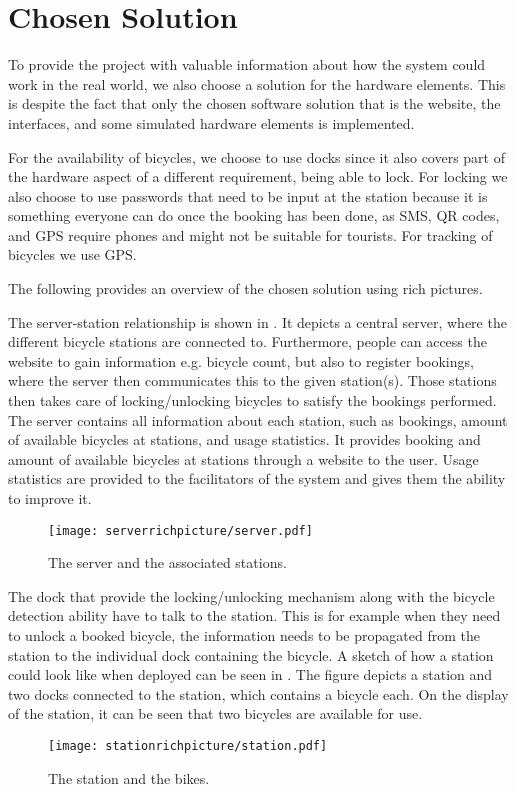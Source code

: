 \section{Chosen Solution}
To provide the project with valuable information about how the system could work in the real world, we also choose a solution for the hardware elements.
This is despite the fact that only the chosen software solution that is the website, the interfaces, and some simulated hardware elements is implemented.

For the availability of bicycles, we choose to use docks since it also covers part of the hardware aspect of a different requirement, being able to lock.  
For locking we also choose to use passwords that need to be input at the station because it is something everyone can do once the booking has been done, as SMS, QR codes, and GPS require phones and might not be suitable for tourists.
For tracking of bicycles we use GPS.

The following provides an overview of the chosen solution using rich pictures.

The server-station relationship is shown in .
It depicts a central server, where the different bicycle stations are connected to.
Furthermore, people can access the website to gain information e.g. bicycle count, but also to register bookings, where the server then communicates this to the given station(s).
Those stations then takes care of locking/unlocking bicycles to satisfy the bookings performed.
The server contains all information about each station, such as bookings, amount of available bicycles at stations, and usage statistics.
It provides booking and amount of available bicycles at stations through a website to the user. 
Usage statistics are provided to the facilitators of the system and gives them the ability to improve it. 

\begin{figure}[h]
\centering
\texttt{[image: serverrichpicture/server.pdf]}
\caption{The server and the associated stations.}
\label{fig:ServerRichPicture}
\end{figure}

The dock that provide the locking/unlocking mechanism along with the bicycle detection ability have to talk to the station. 
This is for example when they need to unlock a booked bicycle, the information needs to be propagated from the station to the individual dock containing the bicycle.
A sketch of how a station could look like when deployed can be seen in .
The figure depicts a station and two docks connected to the station, which contains a bicycle each. 
On the display of the station, it can be seen that two bicycles are available for use.
\begin{figure}[h]
\centering
\texttt{[image: stationrichpicture/station.pdf]}
\caption{The station and the bikes.}
\label{fig:StationRichPicture}
\end{figure}